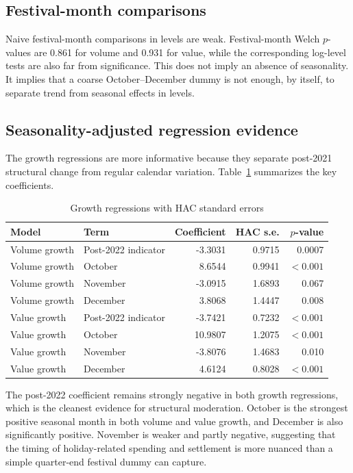 \documentclass[11pt]{article}
\begin{document}
\subsection{Festival-month comparisons}

Naive festival-month comparisons in levels are weak. Festival-month Welch $p$-values are 0.861 for volume and 0.931 for value, while the corresponding log-level tests are also far from significance. This does not imply an absence of seasonality. It implies that a coarse October--December dummy is not enough, by itself, to separate trend from seasonal effects in levels.

\subsection{Seasonality-adjusted regression evidence}

The growth regressions are more informative because they separate post-2021 structural change from regular calendar variation. Table~\ref{tab:regression-results} summarizes the key coefficients.

\begin{table}[H]
\centering
\caption{Growth regressions with HAC standard errors}
\label{tab:regression-results}
\small
\begin{tabular}{l l r r r}
\toprule
Model & Term & Coefficient & HAC s.e. & $p$-value \\
\midrule
Volume growth & Post-2022 indicator & -3.3031 & 0.9715 & 0.0007 \\
Volume growth & October & 8.6544 & 0.9941 & $<0.001$ \\
Volume growth & November & -3.0915 & 1.6893 & 0.067 \\
Volume growth & December & 3.8068 & 1.4447 & 0.008 \\
Value growth & Post-2022 indicator & -3.7421 & 0.7232 & $<0.001$ \\
Value growth & October & 10.9807 & 1.2075 & $<0.001$ \\
Value growth & November & -3.8076 & 1.4683 & 0.010 \\
Value growth & December & 4.6124 & 0.8028 & $<0.001$ \\
\bottomrule
\end{tabular}
\end{table}

The post-2022 coefficient remains strongly negative in both growth regressions, which is the cleanest evidence for structural moderation. October is the strongest positive seasonal month in both volume and value growth, and December is also significantly positive. November is weaker and partly negative, suggesting that the timing of holiday-related spending and settlement is more nuanced than a simple quarter-end festival dummy can capture.
\end{document}
